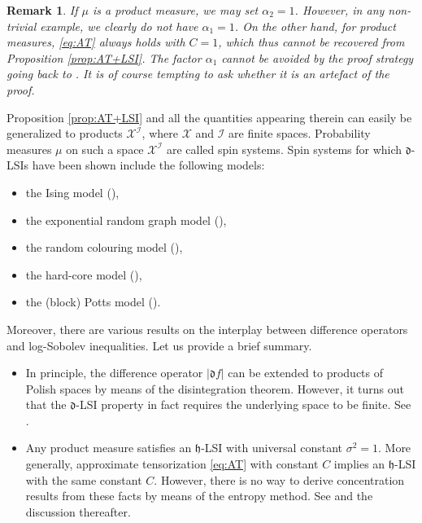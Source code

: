 \documentclass[a4paper,12pt]{amsart}
\numberwithin{equation}{section}
\newtheorem{bemerkung}[satz]{Remark}
\theoremstyle{remark}
\newcommand				{\dpartial}	{\mathfrak{d}}
\begin{document}
\begin{bemerkung}
If $\mu$ is a product measure, we may set $\alpha_2=1$. However, in any non-trivial example, we clearly do not have $\alpha_1=1$. On the other hand, for product measures, \eqref{eq:AT} always holds with $C=1$, which thus cannot be recovered from Proposition \ref{prop:AT+LSI}. The factor $\alpha_1$ cannot be avoided by the proof strategy going back to \cite{Mar19}. It is of course tempting to ask whether it is an artefact of the proof.
\end{bemerkung}

Proposition \ref{prop:AT+LSI} and all the quantities appearing therein can easily be generalized to products $\mathcal{X}^\mathcal{I}$, where $\mathcal{X}$ and $\mathcal{I}$ are finite spaces. Probability measures $\mu$ on such a space $\mathcal{X}^\mathcal{I}$ are called spin systems. Spin systems for which $\dpartial$-LSIs have been shown include the following models:
\begin{itemize}
\item the Ising model (\cite{BGS19}),
\item the exponential random graph model (\cite{SS20}),
\item the random colouring model (\cite{SS20}),
\item the hard-core model (\cite{SS20}),
\item the (block) Potts model (\cite{KLS21}).
\end{itemize}

Moreover, there are various results on the interplay between difference operators and log-Sobolev inequalities. Let us provide a brief summary.
\begin{itemize}
\item In principle, the difference operator $|\dpartial f|$ can be extended to products of Polish spaces by means of the disintegration theorem. However, it turns out that the $\dpartial$-LSI property in fact requires the underlying space to be finite. See \cite[Prop.\ 6]{GSS21a}.
\item Any product measure satisfies an $\mathfrak{h}$-LSI with universal constant $\sigma^2=1$. More generally, approximate tensorization \eqref{eq:AT} with constant $C$ implies an $\mathfrak{h}$-LSI with the same constant $C$. However, there is no way to derive concentration results from these facts by means of the entropy method. See \cite[Th.\ 7]{GSS21a} and the discussion thereafter.
\end{itemize}
\end{document}
